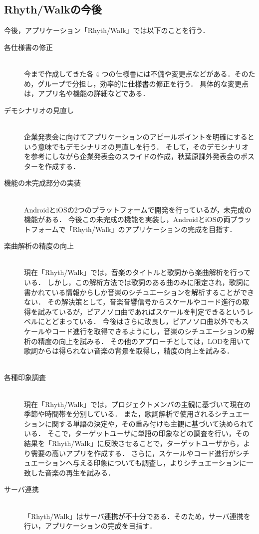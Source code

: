 \subsection{Rhyth/Walkの今後}
\par
今後，アプリケーション「Rhyth/Walk」では以下のことを行う．

\begin{description}
 \item[各仕様書の修正]\mbox{}\\ 
	    今まで作成してきた各 4 つの仕様書には不備や変更点などがある．そのため，グループで分担し，効率的に仕様書の修正を行う．
	    具体的な変更点は，アプリ名や機能の詳細などである．
	    
 \item[デモシナリオの見直し]\mbox{}\\
	    企業発表会に向けてアプリケーションのアピールポイントを明確にするという意味でもデモシナリオの見直しを行う．
	    そして，そのデモシナリオを参考にしながら企業発表会のスライドの作成，秋葉原課外発表会のポスターを作成する．

 \item[機能の未完成部分の実装]\mbox{}\\
	    AndroidとiOSの2つのプラットフォームで開発を行っているが，未完成の機能がある．
	    今後この未完成の機能を実装し，AndroidとiOSの両プラットフォームで「Rhyth/Walk」のアプリケーションの完成を目指す．

\item[楽曲解析の精度の向上]\mbox{}\\
	    現在「Rhyth/Walk」では，音楽のタイトルと歌詞から楽曲解析を行っている．
	    しかし，この解析方法では歌詞のある曲のみに限定され，歌詞に書かれている情報からしか音楽のシチュエーションを解析することができない．
	    その解決策として，音楽音響信号からスケールやコード進行の取得を試みているが，ピアノソロ曲であればスケールを判定できるというレベルにとどまっている．
	    今後はさらに改良し，ピアノソロ曲以外でもスケールやコード進行を取得できるようにし，音楽のシチュエーションの解析の精度の向上を試みる．
	    その他のアプローチとしては，LODを用いて歌詞からは得られない音楽の背景を取得し，精度の向上を試みる．
　　　
\item[各種印象調査]\mbox{}\\
	    現在「Rhyth/Walk」では，プロジェクトメンバの主観に基づいて現在の季節や時間帯を分別している．
	    また，歌詞解析で使用されるシチュエーションに関する単語の決定や，その重み付けも主観に基づいて決められている．
	    そこで，ターゲットユーザに単語の印象などの調査を行い，その結果を「Rhyth/Walk」に反映させることで，ターゲットユーザから，より需要の高いアプリを作成する．
	    さらに，スケールやコード進行がシチュエーションへ与える印象についても調査し，よりシチュエーションに一致した音楽の再生を試みる．
　　　
\item[サーバ連携]\mbox{}\\
	    「Rhyth/Walk」はサーバ連携が不十分である．そのため，サーバ連携を行い，アプリケーションの完成を目指す．


\end{description}
